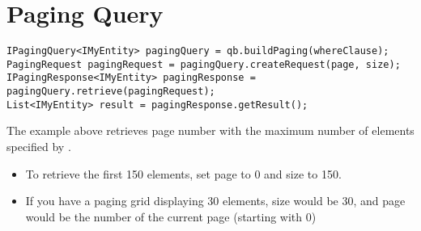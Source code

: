 \section{Paging Query}
\label{feature:PagingQuery}
\ClearAPI
\TODO

\begin{lstlisting}[style=Java,caption={Usage example for the \type{Paging Query} (Java)}]
IPagingQuery<IMyEntity> pagingQuery = qb.buildPaging(whereClause);
PagingRequest pagingRequest = pagingQuery.createRequest(page, size);
IPagingResponse<IMyEntity> pagingResponse = pagingQuery.retrieve(pagingRequest);
List<IMyEntity> result = pagingResponse.getResult();
\end{lstlisting}

The example above retrieves page number  with the maximum number of elements specified by . 
\begin{itemize}
\item To retrieve the first 150 elements, set page to 0 and size to 150.
\item If you have a paging grid displaying 30 elements, size would be 30, and page would be the number of the current page (starting with 0)
\end{itemize}